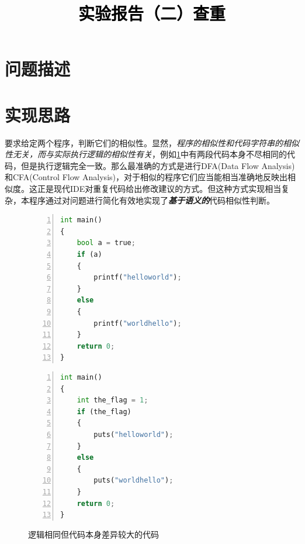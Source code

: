 \documentclass[a4paper,twoside]{article}
\newcommand{\PaperTitle}{实验报告（二）查重}  %
\begin{document}
\newpage

\title{
	\Large{\textcolor{black}{\PaperTitle}}
}
	
	
\maketitle
	
\tableofcontents
 
\newpage
\setcounter{page}{1}

\begin{spacing}{1.2}

\section{问题描述}

\section{实现思路}

要求给定两个程序，判断它们的相似性。显然，\emph{程序的相似性和代码字符串的相似性无关，而与实际执行逻辑的相似性有关}，例如\ref{fig:dupcode}中有两段代码本身不尽相同的代码，但是执行逻辑完全一致。那么最准确的方式是进行DFA(Data Flow Analysis)和CFA(Control Flow Analysis)，对于相似的程序它们应当能相当准确地反映出相似度。这正是现代IDE对重复代码给出修改建议的方式。但这种方式实现相当复杂，本程序通过对问题进行简化有效地实现了\emph{\textbf{基于语义的}}代码相似性判断。

\begin{figure}[htbp]
\caption{逻辑相同但代码本身差异较大的代码}
\label{fig:dupcode}
\begin{minipage}{0.48\textwidth}
\begin{lstlisting}[language=Python,numbers=left,style=PythonStyle,label={code:dupexample1}]
int main()
{
	bool a = true;
	if (a)
	{
		printf("helloworld");
	}
	else
	{
		printf("worldhello");
	}
	return 0;
}
\end{lstlisting}
\end{minipage}
\begin{minipage}{0.48\textwidth}
\begin{lstlisting}[language=Python,numbers=left,style=PythonStyle,label={code:dupexample2}]
int main()
{
	int the_flag = 1;
	if (the_flag)
	{
		puts("helloworld");
	}
	else
	{
		puts("worldhello");
	}
	return 0;
}
\end{lstlisting}
\end{minipage}
\end{figure}


\end{spacing}
\end{document}
